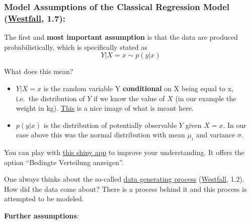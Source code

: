 \documentclass[
]{book}
\providecommand{\tightlist}{%
  \setlength{\itemsep}{0pt}\setlength{\parskip}{0pt}}
\begin{document}
\subsubsection{\texorpdfstring{Model Assumptions of the Classical Regression Model (\href{https://www.routledge.com/Understanding-Regression-Analysis-A-Conditional-Distribution-Approach/Westfall-Arias/p/book/9780367493516?srsltid=AfmBOore3O_Ciecl0TTkr9AjPIY1d6OmbQa7o7IAdKpTSkD8s9HkwzD4}{Westfall}, 1.7):}{Model Assumptions of the Classical Regression Model (Westfall, 1.7):}}\label{_model_assumptions}

The first and \textbf{most important assumption} is that the data are produced\\
probabilistically, which is specifically stated as
\[ Y|X = x \sim p(y|x)\]

What does this mean?

\begin{itemize}
\tightlist
\item
  \(Y|X = x\) is the random variable Y \textbf{conditional} on X being equal to x, i.e.~the
  distribution of \(Y\) if we know the value of \(X\) (in our example the weight in kg).
  \href{https://blogs.sas.com/content/iml/files/2015/09/GLM_normal_identity.png}{This} is a nice image of what is meant here.
\item
  \(p(y|x)\) is the distribution of potentially observable \(Y\) given \(X = x\).
  In our case above this was the normal distribution with mean \(\mu_i\) and variance \(\sigma\).
\end{itemize}

You can play with \href{https://psychmeth.shinyapps.io/Regression-NVFehler/}{this shiny app} to improve your understanding.
It offers the option ``Bedingte Verteilung anzeigen''.

One always thinks about the so-called
\href{https://en.wikipedia.org/wiki/Data_generating_process}{data generating process}
(\href{https://www.routledge.com/Understanding-Regression-Analysis-A-Conditional-Distribution-Approach/Westfall-Arias/p/book/9780367493516?srsltid=AfmBOore3O_Ciecl0TTkr9AjPIY1d6OmbQa7o7IAdKpTSkD8s9HkwzD4}{Westfall}, 1.2).
How did the data come about? There is a process behind it and this process
is attempted to be modeled.

\textbf{Further assumptions}:
\end{document}
